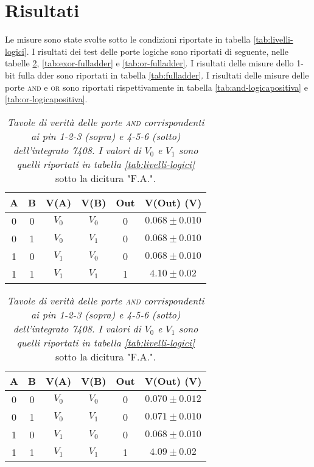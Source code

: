 \section{Risultati}\label{sec:risultati}
Le misure sono state svolte sotto le condizioni riportate in tabella \ref{tab:livelli-logici}.
I risultati dei test delle porte logiche sono riportati di seguente, nelle tabelle \ref{tab:and-fulladder}, \ref{tab:exor-fulladder} e \ref{tab:or-fulladder}.
I risultati delle misure dello 1-bit fulla dder sono riportati in tabella \ref{tab:fulladder}.
I risultati delle misure delle porte \textsc{and} e \textsc{or} sono riportati rispettivamente in tabella \ref{tab:and-logicapositiva} e \ref{tab:or-logicapositiva}.

\begin{table}[H]
  \centering
  \begin{subtable}[H]{0.5\textwidth}
    \centering
    \begin{tabular}[t]{c  c | c  c | c  c}
      \hline
      A & B & V(A) & V(B) & Out & V(Out) (V)\\
      \hline
      0 & 0 & $V_{0}$ & $V_{0}$ & 0 & $0.068 \pm 0.010$ \\
      0 & 1 & $V_{0}$ & $V_{1}$ & 0 & $0.068 \pm 0.010$ \\
      1 & 0 & $V_{1}$ & $V_{0}$ & 0 & $0.068 \pm 0.010$ \\
      1 & 1 & $V_{1}$ & $V_{1}$ & 1 & $4.10 \pm 0.02$ \\
      \hline
    \end{tabular}
  \end{subtable}

  \vspace{.5cm}

  \begin{subtable}[H]{0.5\textwidth}
    \centering
    \begin{tabular}[t]{c  c | c  c | c  c}
      \hline
      A & B & V(A) & V(B) & Out & V(Out) (V)\\
      \hline
      0 & 0 & $V_{0}$ & $V_{0}$ & 0 & $0.070 \pm 0.012$ \\
      0 & 1 & $V_{0}$ & $V_{1}$ & 0 & $0.071 \pm 0.010$ \\
      1 & 0 & $V_{1}$ & $V_{0}$ & 0 & $0.068 \pm 0.010$ \\
      1 & 1 & $V_{1}$ & $V_{1}$ & 1 & $4.09 \pm 0.02$ \\
      \hline
    \end{tabular}
  \end{subtable}
  \caption{\emph{Tavole di verità delle porte \textsc{and} corrispondenti ai pin 1-2-3 (sopra) e 4-5-6 (sotto) dell'integrato 7408. I valori di $V_{0}$ e $V_{1}$ sono quelli riportati in tabella \ref{tab:livelli-logici}} sotto la dicitura "F.A.".}
  \label{tab:and-fulladder}
\end{table}

